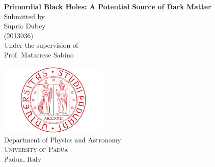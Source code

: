 \begin{titlepage}

\begin{center}

\vspace{.2in}
\huge \textbf {Primordial Black Holes: A Potential Source of Dark Matter}\\[0.5in]



\normalsize Submitted by \\
\vspace{.1in}
\Large Suprio Dubey\\
(2013036)\\

\vspace{.3in}
Under the supervision of\\
\vspace{.3in}
\Large Prof. Matarrese Sabino\\
\vspace{.1in}
\vspace{1in}

\includegraphics[width=0.4\textwidth]{logo.jpg}\\[0.1in]
\Large{Department of Physics and Astronomy}\\
\normalsize
\textsc{University of Padua}\\
Padua, Italy \\
\vspace{0.2cm}

\end{center}

\end{titlepage}
